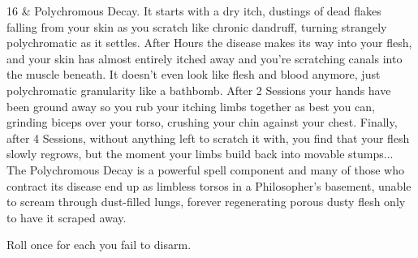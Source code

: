 {    16 &  Polychromous Decay. It starts with a dry itch, dustings of dead flakes falling from your skin as you scratch like chronic dandruff, turning strangely polychromatic as it settles. After Hours the disease makes its way into your flesh, and your skin has almost entirely itched away and you're scratching canals into the muscle beneath. It doesn't even look like flesh and blood anymore, just polychromatic granularity like a bathbomb.  After 2 Sessions your hands have been ground away so you rub your itching limbs together as best you can, grinding biceps over your torso, crushing your chin against your chest.  Finally, after 4 Sessions, without anything left to scratch it with, you find that your flesh slowly regrows, but the moment your limbs build back into movable stumps... The Polychromous Decay is a powerful spell component and many of those who contract its disease end up as limbless torsos in a Philosopher's basement, unable to scream through dust-filled lungs, forever regenerating porous dusty flesh only to have it scraped away.  \\

}


\newpage



Roll once for each  you fail to disarm.  




